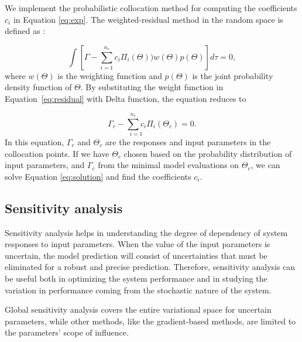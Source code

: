 We implement the probabilistic collocation method for computing the
coefficients $c_i$ in Equation \ref{eq:exp}. The weighted-residual method in
the random space is defined as \cite{nLi2007}:


\begin{equation}
\int\left[\Gamma-\underset{i=1}{\overset{n_c}{\sum}}c_{i}\Pi_{i}
(\Theta))w(\Theta)p(\Theta)\right]d\tau=0,\label{eq:residual}
\end{equation}
where $w(\Theta)$ is the weighting function and $p(\Theta)$ is the joint
probability density function of $\Theta$. By substituting the weight function in
Equation~\ref{eq:residual} with  Delta function, the equation reduces to

\begin{equation}
 \Gamma_{c}-\underset{i=1}{\overset{n_c}{\sum}c_{i}}\Pi_{i}(\Theta_{c})=0.
\label{eq:solution}
\end{equation} In this equation, $\Gamma_c$ and $\Theta_c$ are the responses and
input parameters in the collocation points. If we have $\Theta_c$ chosen based
on the probability distribution of input parameters, and $\Gamma_c$ from the
minimal model evaluations on $\Theta_c$, we can solve Equation
\ref{eq:solution} and find the coefficients $c_i$.

\subsection{Sensitivity analysis}
\label{Section:SA}

Sensitivity analysis helps in understanding the degree of dependency of system
responses to input parameters. When the value of the input parameters is uncertain, the model prediction will consist of uncertainties that must be
eliminated for a robust and precise prediction. Therefore, sensitivity analysis
can be useful both in optimizing the system performance and in studying the
variation in performance coming from the stochastic nature of the system.

Global sensitivity analysis covers the entire variational space for uncertain
parameters, while other methods, like the gradient-based methods, are limited
to the parameters' scope of influence. 


